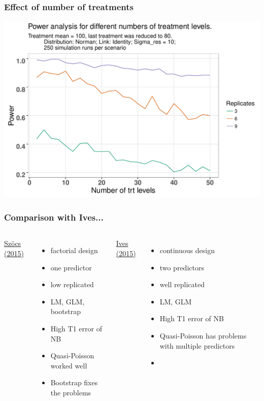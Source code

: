 \documentclass[
	12pt
	]{beamer}
\begin{document}
\begin{frame}
\frametitle{Effect of number of treatments}
	\includegraphics[width =\textwidth]{figs/p_power_trt.pdf}
\end{frame}


\begin{frame}
\frametitle{Comparison with Ives...}
	\begin{columns}[T]
	    	\underline{Szöcs (2015)}
	    	\begin{itemize}
	        	\item factorial design
	        	\item one predictor
	        	\item low replicated
	        	\item LM, GLM, bootstrap
	        	\item High T1 error of NB
	        	\item Quasi-Poisson worked well \vspace{1.2em}
	        	\item Bootstrap fixes the problems
	        \end{itemize}
	    	\underline{Ives (2015)}
	        \begin{itemize}
	        	\item continuous design
	        	\item two predictors
	        	\item well replicated
	        	\item LM, GLM
	        	\item High T1 error of NB
	        	\item Quasi-Poisson has problems with multiple predictors
	        	\item
	        \end{itemize}
	\end{columns}
\end{frame}
\end{document}
